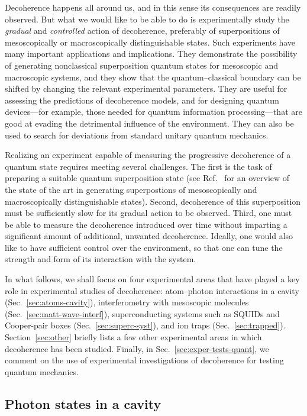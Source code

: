 \documentclass[3p,sort&compress]{elsarticle}
\begin{document}
Decoherence happens all around us, and in this sense its consequences are readily observed. But what we would like to be able to do is experimentally study the \emph{gradual} and \emph{controlled} action of decoherence, preferably of superpositions of mesoscopically or macroscopically distinguishable states. Such experiments have many important applications and implications. They demonstrate the possibility of generating nonclassical superposition quantum states for mesoscopic and macroscopic systems, and they show that the quantum--classical boundary can be shifted by changing the relevant experimental parameters. They are useful for assessing the predictions of decoherence models, and for designing quantum devices---for example, those needed for quantum information processing---that are good at evading the detrimental influence of the environment. They can also be used to search for deviations from standard unitary quantum mechanics.

Realizing an experiment capable of measuring the progressive decoherence of a quantum state requires meeting several challenges. The first is the task of preparing a suitable quantum superposition state (see Ref.~\cite{Arndt:2014:oo} for an overview of the state of the art in generating superpostions of mesoscopically and macroscopically distinguishable states). Second, decoherence of this superposition must be sufficiently slow for its gradual action to be observed.  Third, one must be able to measure the decoherence introduced over time without imparting a significant amount of additional, unwanted decoherence. Ideally, one would also like to have sufficient control over the environment, so that one can tune the strength and form of its interaction with the system.

In what follows, we shall focus on four experimental areas that have played a key role in experimental studies of decoherence: atom--photon interactions in a cavity (Sec.~\ref{sec:atoms-cavity}), interferometry with mesoscopic molecules (Sec.~\ref{sec:matt-wave-interf}), superconducting systems such as SQUIDs and Cooper-pair boxes (Sec.~\ref{sec:superc-syst}), and ion traps (Sec.~\ref{sec:trapped}). Section~\ref{sec:other} briefly lists a few other experimental areas in which decoherence has been studied. Finally, in Sec.~\ref{sec:exper-tests-quant}, we comment on the use of experimental investigations of decoherence for testing quantum mechanics.

\subsection{\label{sec:atoms-cavity}Photon states in a cavity}
\end{document}
